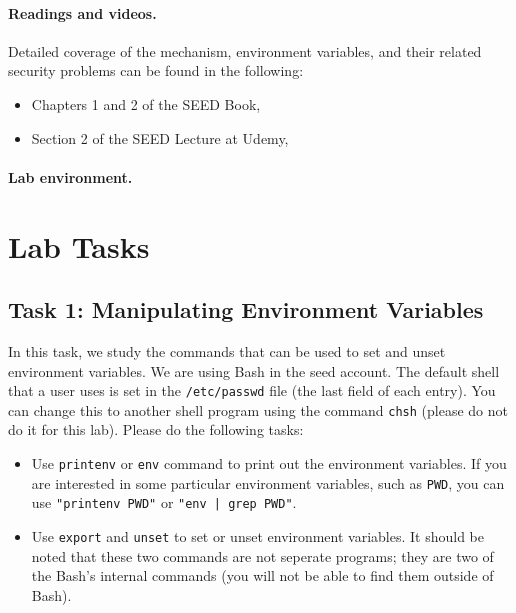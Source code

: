 \paragraph{Readings and videos.}
Detailed coverage of the \setuid mechanism, environment variables,
and their related security problems can be found in the following:

\begin{itemize}
\item Chapters 1 and 2 of the SEED Book, \seedbook
\item Section 2 of the SEED Lecture at Udemy, \seedcsvideo
\end{itemize}

\paragraph{Lab environment.} \seedenvironmentB





\section{Lab Tasks}



\subsection{Task 1: Manipulating Environment Variables}

In this task, we study the commands that can be used to set and unset
environment variables. We are using Bash in the seed account. The default
shell that a user uses is set in  the {\tt /etc/passwd} file (the last
field of each entry). You can change this to another shell program using
the command {\tt chsh} (please do not do it for this lab). Please 
do the following tasks:

\begin{itemize}
\item Use {\tt printenv} or {\tt env} command to print out the 
environment variables. If you are interested in some particular 
environment variables, such as {\tt PWD}, you can use {\tt "printenv PWD"}
or {\tt "env | grep PWD"}. 


\item Use {\tt export} and {\tt unset} to set or unset environment
variables. It should be noted that 
these two commands are not seperate programs; they are two of 
the Bash's internal commands (you will not be able to find them
outside of Bash).

\end{itemize}





